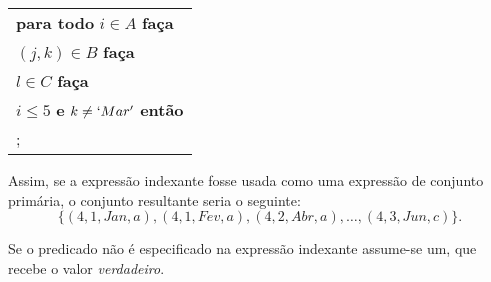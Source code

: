 \documentclass[11pt, brazil]{report}
\begin{document}

\noindent\hfil
\begin{tabular}{@{}l@{}}
{\bf para todo} $i\in A$ {\bf faça}\\
\hspace{16pt}{\bf para todo} $(j,k)\in B$ {\bf faça}\\
\hspace{32pt}{\bf para todo} $l\in C$ {\bf faça}\\
\hspace{48pt}{\bf se} $i\leq 5$ {\bf e} $k\neq`Mar'$ {\bf então}\\
\hspace{64pt}{\it ação};\\
\end{tabular}


\noindent Assim, se a expressão indexante fosse usada como uma
expressão de conjunto primária, o conjunto resultante seria o seguinte:
$$\{(4,1,Jan,a),(4,1,Fev,a),(4,2,Abr,a),\dots,(4,3,Jun,c)\}.$$

Se o predicado não é especificado na expressão indexante assume-se um,
que recebe o valor {\it verdadeiro}.

%
\end{document}
